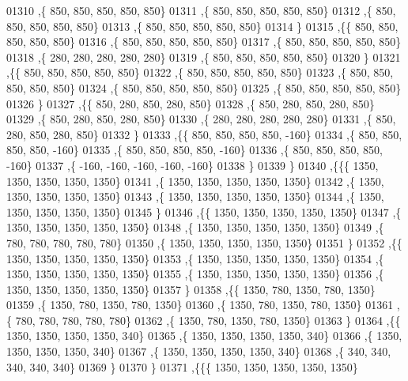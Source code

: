 \begin{DoxyCode}
01310    ,\{   850,   850,   850,   850,   850\}
01311    ,\{   850,   850,   850,   850,   850\}
01312    ,\{   850,   850,   850,   850,   850\}
01313    ,\{   850,   850,   850,   850,   850\}
01314    \}
01315   ,\{\{   850,   850,   850,   850,   850\}
01316    ,\{   850,   850,   850,   850,   850\}
01317    ,\{   850,   850,   850,   850,   850\}
01318    ,\{   280,   280,   280,   280,   280\}
01319    ,\{   850,   850,   850,   850,   850\}
01320    \}
01321   ,\{\{   850,   850,   850,   850,   850\}
01322    ,\{   850,   850,   850,   850,   850\}
01323    ,\{   850,   850,   850,   850,   850\}
01324    ,\{   850,   850,   850,   850,   850\}
01325    ,\{   850,   850,   850,   850,   850\}
01326    \}
01327   ,\{\{   850,   280,   850,   280,   850\}
01328    ,\{   850,   280,   850,   280,   850\}
01329    ,\{   850,   280,   850,   280,   850\}
01330    ,\{   280,   280,   280,   280,   280\}
01331    ,\{   850,   280,   850,   280,   850\}
01332    \}
01333   ,\{\{   850,   850,   850,   850,  -160\}
01334    ,\{   850,   850,   850,   850,  -160\}
01335    ,\{   850,   850,   850,   850,  -160\}
01336    ,\{   850,   850,   850,   850,  -160\}
01337    ,\{  -160,  -160,  -160,  -160,  -160\}
01338    \}
01339   \}
01340  ,\{\{\{  1350,  1350,  1350,  1350,  1350\}
01341    ,\{  1350,  1350,  1350,  1350,  1350\}
01342    ,\{  1350,  1350,  1350,  1350,  1350\}
01343    ,\{  1350,  1350,  1350,  1350,  1350\}
01344    ,\{  1350,  1350,  1350,  1350,  1350\}
01345    \}
01346   ,\{\{  1350,  1350,  1350,  1350,  1350\}
01347    ,\{  1350,  1350,  1350,  1350,  1350\}
01348    ,\{  1350,  1350,  1350,  1350,  1350\}
01349    ,\{   780,   780,   780,   780,   780\}
01350    ,\{  1350,  1350,  1350,  1350,  1350\}
01351    \}
01352   ,\{\{  1350,  1350,  1350,  1350,  1350\}
01353    ,\{  1350,  1350,  1350,  1350,  1350\}
01354    ,\{  1350,  1350,  1350,  1350,  1350\}
01355    ,\{  1350,  1350,  1350,  1350,  1350\}
01356    ,\{  1350,  1350,  1350,  1350,  1350\}
01357    \}
01358   ,\{\{  1350,   780,  1350,   780,  1350\}
01359    ,\{  1350,   780,  1350,   780,  1350\}
01360    ,\{  1350,   780,  1350,   780,  1350\}
01361    ,\{   780,   780,   780,   780,   780\}
01362    ,\{  1350,   780,  1350,   780,  1350\}
01363    \}
01364   ,\{\{  1350,  1350,  1350,  1350,   340\}
01365    ,\{  1350,  1350,  1350,  1350,   340\}
01366    ,\{  1350,  1350,  1350,  1350,   340\}
01367    ,\{  1350,  1350,  1350,  1350,   340\}
01368    ,\{   340,   340,   340,   340,   340\}
01369    \}
01370   \}
01371  ,\{\{\{  1350,  1350,  1350,  1350,  1350\}

\end{DoxyCode}
